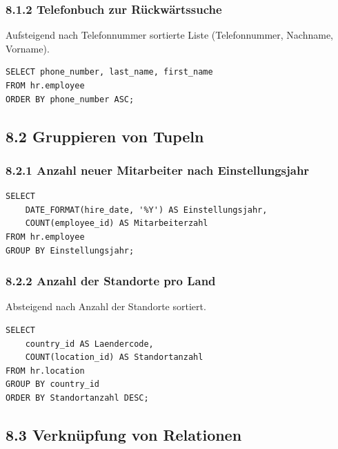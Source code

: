 \documentclass[11pt,a4paper]{article}
\begin{document}
\subsubsection*{8.1.2 \quad Telefonbuch zur R\"uckw\"artssuche}
Aufsteigend nach Telefonnummer sortierte Liste (Telefonnummer, Nachname, Vorname).
\begin{loesung}
\begin{lstlisting}
SELECT phone_number, last_name, first_name
FROM hr.employee
ORDER BY phone_number ASC;
\end{lstlisting}
\end{loesung}

\subsection*{8.2 \quad Gruppieren von Tupeln}
\subsubsection*{8.2.1 \quad Anzahl neuer Mitarbeiter nach Einstellungsjahr}
\begin{loesung}
\begin{lstlisting}
SELECT
    DATE_FORMAT(hire_date, '%Y') AS Einstellungsjahr,
    COUNT(employee_id) AS Mitarbeiterzahl
FROM hr.employee
GROUP BY Einstellungsjahr;
\end{lstlisting}
\end{loesung}

\subsubsection*{8.2.2 \quad Anzahl der Standorte pro Land}
Absteigend nach Anzahl der Standorte sortiert.
\begin{loesung}
\begin{lstlisting}
SELECT
    country_id AS Laendercode,
    COUNT(location_id) AS Standortanzahl
FROM hr.location
GROUP BY country_id
ORDER BY Standortanzahl DESC;
\end{lstlisting}
\end{loesung}

\subsection*{8.3 \quad Verkn\"upfung von Relationen}
\end{document}
